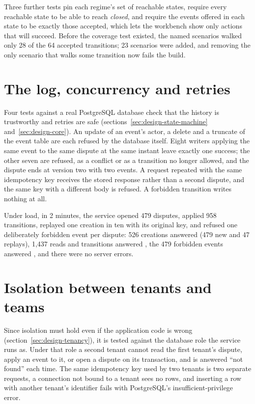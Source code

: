 Three further tests pin each regime's set of reachable states, require every reachable state to be able to reach
\emph{closed}, and require the events offered in each state to be exactly those accepted, which lets the workbench
show only actions that will succeed. Before the coverage test existed, the named scenarios walked only 28 of the
64 accepted transitions; 23 scenarios were added, and removing the only scenario that walks some transition now
fails the build.

\section{The log, concurrency and retries}
\label{sec:eval-log}

Four tests against a real PostgreSQL database check that the history is trustworthy and retries are safe
(sections~\ref{sec:design-state-machine} and~\ref{sec:design-core}). An update of an event's actor, a delete and
a truncate of the event table are each refused by the database itself. Eight writers applying the same event to
the same dispute at the same instant leave exactly one success; the other seven are refused, as a conflict or as
a transition no longer allowed, and the dispute ends at version two with two events. A request repeated with the
same idempotency key receives the stored response rather than a second dispute, and the same key with a different
body is refused. A forbidden transition writes nothing at all.

Under load, in 2 minutes, the service opened 479 disputes, applied 958 transitions, replayed one creation in ten
with its original key, and refused one deliberately forbidden event per dispute: 526 creations answered
 (479 new and 47 replays), 1,437 reads and transitions answered , the 479 forbidden events
answered , and there were no server errors.

\section{Isolation between tenants and teams}
\label{sec:eval-isolation}

Since isolation must hold even if the application code is wrong (section~\ref{sec:design-tenancy}), it is tested
against the database role the service runs as. Under that role a second tenant cannot read the first tenant's
dispute, apply an event to it, or open a dispute on its transaction, and is answered ``not found'' each time. The
same idempotency key used by two tenants is two separate requests, a connection not bound to a tenant sees no rows,
and inserting a row with another tenant's identifier fails with PostgreSQL's insufficient-privilege error.

